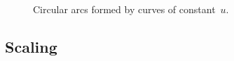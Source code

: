 \begin{figure}
  \newcommand*{\subfigurewidth}{0.35\textwidth}
  \centering
  \hspace*{\fill}
  \begin{subfigure}[t]{\subfigurewidth}
  \end{subfigure}
    \hfill
  \begin{subfigure}[t]{\subfigurewidth}
  \end{subfigure}
  \hspace*{\fill}
  \caption{
    Circular arcs formed by curves of constant~$u$.
  }
  \label{fig:bipolar-u}
\end{figure}

\subsection{Scaling}
\label{sec:bipolar.known.scaling}

